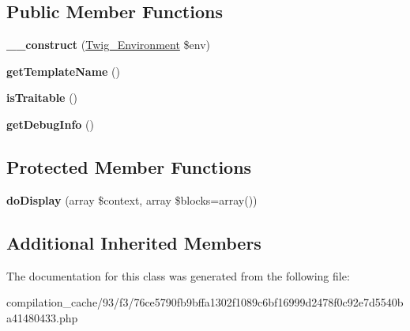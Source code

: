 \subsection*{Public Member Functions}
\begin{DoxyCompactItemize}
\item 
\hypertarget{class_____twig_template__93f376ce5790fb9bffa1302f1089c6bf16999d2478f0c92e7d5540ba41480433_a4f8326243132c1450a81e0a817aa1be7}{}{\bfseries \+\_\+\+\_\+construct} (\hyperlink{class_twig___environment}{Twig\+\_\+\+Environment} \$env)\label{class_____twig_template__93f376ce5790fb9bffa1302f1089c6bf16999d2478f0c92e7d5540ba41480433_a4f8326243132c1450a81e0a817aa1be7}

\item 
\hypertarget{class_____twig_template__93f376ce5790fb9bffa1302f1089c6bf16999d2478f0c92e7d5540ba41480433_a621a3ccd148ed8b9e937da6959c98f39}{}{\bfseries get\+Template\+Name} ()\label{class_____twig_template__93f376ce5790fb9bffa1302f1089c6bf16999d2478f0c92e7d5540ba41480433_a621a3ccd148ed8b9e937da6959c98f39}

\item 
\hypertarget{class_____twig_template__93f376ce5790fb9bffa1302f1089c6bf16999d2478f0c92e7d5540ba41480433_aa9eb89be270f6afc256ef5e272b78a63}{}{\bfseries is\+Traitable} ()\label{class_____twig_template__93f376ce5790fb9bffa1302f1089c6bf16999d2478f0c92e7d5540ba41480433_aa9eb89be270f6afc256ef5e272b78a63}

\item 
\hypertarget{class_____twig_template__93f376ce5790fb9bffa1302f1089c6bf16999d2478f0c92e7d5540ba41480433_abd0ecb0136f4228db2bd963bfc1e20d7}{}{\bfseries get\+Debug\+Info} ()\label{class_____twig_template__93f376ce5790fb9bffa1302f1089c6bf16999d2478f0c92e7d5540ba41480433_abd0ecb0136f4228db2bd963bfc1e20d7}

\end{DoxyCompactItemize}
\subsection*{Protected Member Functions}
\begin{DoxyCompactItemize}
\item 
\hypertarget{class_____twig_template__93f376ce5790fb9bffa1302f1089c6bf16999d2478f0c92e7d5540ba41480433_adb62b7c226e07d30f836ed16158d924f}{}{\bfseries do\+Display} (array \$context, array \$blocks=array())\label{class_____twig_template__93f376ce5790fb9bffa1302f1089c6bf16999d2478f0c92e7d5540ba41480433_adb62b7c226e07d30f836ed16158d924f}

\end{DoxyCompactItemize}
\subsection*{Additional Inherited Members}


The documentation for this class was generated from the following file\+:\begin{DoxyCompactItemize}
\item 
compilation\+\_\+cache/93/f3/76ce5790fb9bffa1302f1089c6bf16999d2478f0c92e7d5540ba41480433.\+php\end{DoxyCompactItemize}
